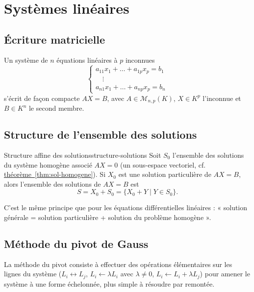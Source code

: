 \documentclass[theme=pringlea]{myrtille}
\begin{document}
\section{Systèmes linéaires}

\subsection{Écriture matricielle}
Un système de $n$ équations linéaires à $p$ inconnues
\[
\begin{cases}
a_{11}x_1 + \dots + a_{1p}x_p = b_1 \\
\quad \vdots \\
a_{n1}x_1 + \dots + a_{np}x_p = b_n
\end{cases}
\]
s'écrit de façon compacte $AX = B$, avec $A \in \mathcal{M}_{n,p}(K)$, $X \in K^p$ l'inconnue et $B \in K^n$ le second membre.

\subsection{Structure de l'ensemble des solutions}
\begin{myrthm}{Structure affine des solutions}{structure-solutions}
Soit $S_0$ l'ensemble des solutions du système homogène associé $AX = 0$ (un sous-espace vectoriel, cf. \hyperref[thm:sol-homogene]{théorème~\ref*{thm:sol-homogene}}). Si $X_0$ est une solution particulière de $AX = B$, alors l'ensemble des solutions de $AX=B$ est
\[ S = X_0 + S_0 = \{ X_0 + Y \mid Y \in S_0 \}. \]
\end{myrthm}

\begin{infobox}
C'est le même principe que pour les équations différentielles linéaires : « solution générale = solution particulière + solution du problème homogène ».
\end{infobox}

\subsection{Méthode du pivot de Gauss}
La méthode du pivot consiste à effectuer des opérations élémentaires sur les lignes du système ($L_i \leftrightarrow L_j$, $L_i \leftarrow \lambda L_i$ avec $\lambda \neq 0$, $L_i \leftarrow L_i + \lambda L_j$) pour amener le système à une forme échelonnée, plus simple à résoudre par remontée.
\end{document}
